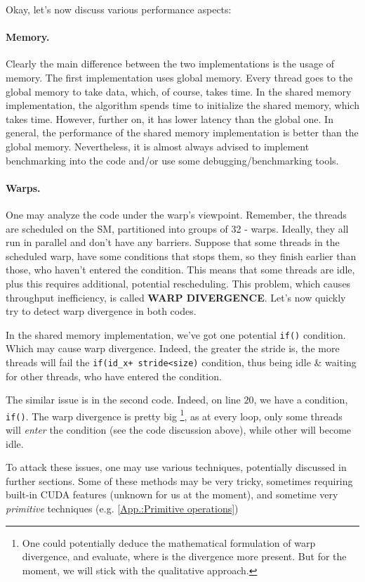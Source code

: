 \documentclass[12pt]{article}
\begin{document}
Okay, let's now discuss various performance aspects:
\paragraph*{Memory.}Clearly the main difference between the two implementations is 
the usage of memory. The first implementation uses global memory. Every thread goes to 
the global memory to take data, which, of course, takes time. In the shared memory implementation,
the algorithm spends time to initialize the shared memory, which takes time. However, further on, it has lower latency than 
the global one. In general, the performance of the shared memory implementation is better than the global memory. 
Nevertheless, it is almost always advised to implement benchmarking into the code and/or use some 
debugging/benchmarking tools.
\paragraph*{Warps.} One may analyze the code under the warp's viewpoint. Remember, the threads are scheduled 
on the SM, partitioned into groups of 32 - warps. Ideally, they all run in parallel and don't have any 
barriers. Suppose that some threads in the scheduled warp, have some conditions that stops them, so they finish earlier than 
those, who haven't entered the condition. This means that some threads are idle, plus this requires additional, potential 
rescheduling. This problem, which causes throughput inefficiency, is called \textbf{WARP DIVERGENCE}. 
Let's now quickly try to detect warp divergence in both codes. 

In the shared memory implementation, we've got one potential
\verb|if()| condition. Which may cause warp divergence. Indeed, the greater the stride is, 
the more threads will fail the \verb|if(id_x+ stride<size)| condition, thus being idle \& waiting for other threads, who have entered the condition.


The similar issue is in the second code. Indeed, on line  $20$, we have a condition, \verb|if()|. 
The warp divergence is pretty big \footnote{One could potentially deduce the mathematical formulation of warp divergence, 
and evaluate, where is the divergence more present. But for the moment, we will stick with the qualitative approach.}, as 
at every loop, only some threads will \textit{enter} the condition (see the code discussion above), while other will become 
idle. 

To attack these issues, one may use various techniques, potentially discussed in further sections. 
Some of these methods may be very tricky, sometimes requiring built-in CUDA features (unknown for us at the moment), and 
sometime very \textit{primitive} techniques (e.g. \autoref{App.:Primitive operations})
\end{document}
